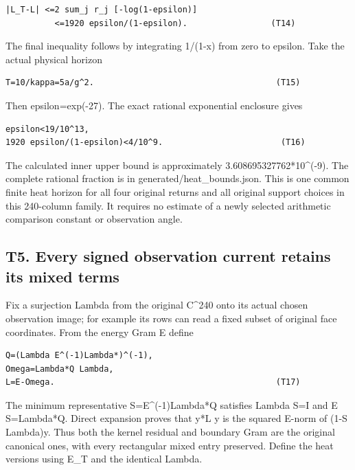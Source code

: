 \documentclass[11pt,a4paper]{article}
\renewcommand{\[}{\begingroup\small\originaldisplaystart}
\renewcommand{\]}{\originaldisplayend\endgroup}
\begin{document}
\begin{verbatim}
|L_T-L| <=2 sum_j r_j [-log(1-epsilon)]
          <=1920 epsilon/(1-epsilon).                 (T14)
\end{verbatim}

The final inequality follows by integrating 1/(1-x) from zero to
epsilon. Take the actual physical horizon

\begin{verbatim}
T=10/kappa=5a/g^2.                                     (T15)
\end{verbatim}

Then epsilon=exp(-27). The exact rational exponential enclosure gives

\begin{verbatim}
epsilon<19/10^13,
1920 epsilon/(1-epsilon)<4/10^9.                        (T16)
\end{verbatim}

The calculated inner upper bound is approximately
3.608695327762*10\^{}(-9). The complete rational fraction is in
{g\allowbreak{}e\allowbreak{}n\allowbreak{}e\allowbreak{}r\allowbreak{}a\allowbreak{}t\allowbreak{}e\allowbreak{}d\allowbreak{}/\allowbreak{}h\allowbreak{}e\allowbreak{}a\allowbreak{}t\allowbreak{}\_\allowbreak{}b\allowbreak{}o\allowbreak{}u\allowbreak{}n\allowbreak{}d\allowbreak{}s\allowbreak{}.\allowbreak{}j\allowbreak{}s\allowbreak{}o\allowbreak{}n\allowbreak{}.\allowbreak{}}
This is one common finite heat horizon for all four original returns and
all original support choices in this 240-column family. It requires no
estimate of a newly selected arithmetic comparison constant or
observation angle.

\subsection{T5. Every signed observation current retains its mixed
terms}\label{t5.-every-signed-observation-current-retains-its-mixed-terms}

Fix a surjection Lambda from the original C\^{}240 onto its actual
chosen observation image; for example its rows can read a fixed subset
of original face coordinates. From the energy Gram E define

\begin{verbatim}
Q=(Lambda E^(-1)Lambda*)^(-1),
Omega=Lambda*Q Lambda,
L=E-Omega.                                             (T17)
\end{verbatim}

The minimum representative S=E\^{}(-1)Lambda*Q satisfies Lambda S=I and
E S=Lambda*Q. Direct expansion proves that y*L y is the squared E-norm
of (1-S Lambda)y. Thus both the kernel residual and boundary Gram are
the original canonical ones, with every rectangular mixed entry
preserved. Define the heat versions using E\_T and the identical Lambda.
\end{document}
